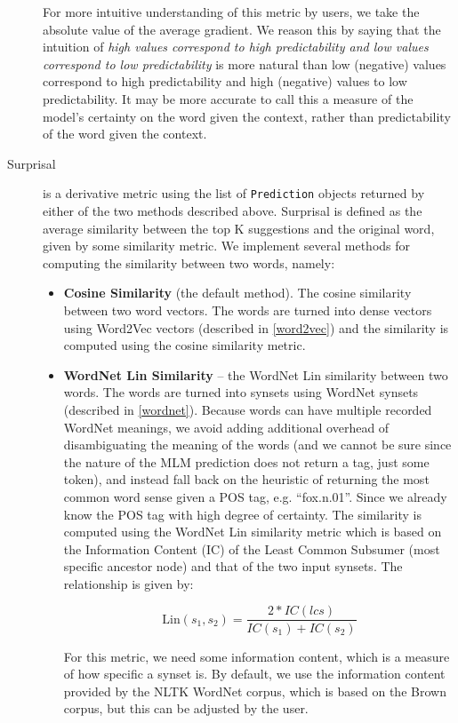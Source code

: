 \begin{description}
        For more intuitive understanding of this metric by users, we take the absolute value of the average gradient. We reason this by saying that the intuition of \textit{high values correspond to high predictability and low values correspond to low predictability} is more natural than low (negative) values correspond to high predictability and high (negative) values to low predictability. It may be more accurate to call this a measure of the model's certainty on the word given the context, rather than predictability of the word given the context.


        \item[Surprisal] is a derivative metric using the list of \texttt{Prediction} objects returned by either of the two methods described above. Surprisal is defined as the average similarity between the top K suggestions and the original word, given by some similarity metric. We implement several methods for computing the similarity between two words, namely:
        \begin{itemize}
            \item \textbf{Cosine Similarity} (the default method). The cosine similarity between two word vectors. The words are turned into dense vectors using Word2Vec vectors (described in \ref{word2vec}) and the similarity is computed using the cosine similarity metric.
            \item \textbf{WordNet Lin Similarity} -- the WordNet Lin similarity between two words. The words are turned into synsets using WordNet synsets (described in \ref{wordnet}). Because words can have multiple recorded WordNet meanings, we avoid adding additional overhead of disambiguating the meaning of the words (and we cannot be sure since the nature of the MLM prediction does not return a tag, just some token), and instead fall back on the heuristic of returning the most common word sense given a POS tag, e.g. ``fox.n.01''. Since we already know the POS tag with high degree of certainty. The similarity is computed using the WordNet Lin similarity metric which is based on the Information Content (IC) of the Least Common Subsumer (most specific ancestor node) and that of the two input synsets. The relationship is given by:
            
            \begin{equation}
                \text{Lin}(s_1, s_2) = \frac{2 * IC(lcs)}{IC(s_1) + IC(s_2)}
            \end{equation}

            For this metric, we need some information content, which is a measure of how specific a synset is. By default, we use the information content provided by the NLTK WordNet corpus, which is based on the Brown corpus, but this can be adjusted by the user.


\end{itemize}
\end{description}
